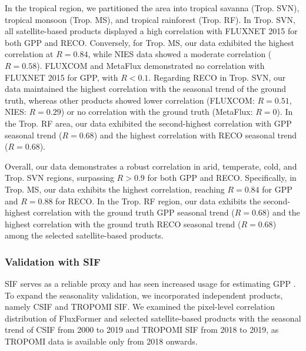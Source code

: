 In the tropical region, we partitioned the area into tropical savanna (Trop. SVN), tropical monsoon (Trop. MS), and tropical rainforest (Trop. RF). In Trop. SVN, all satellite-based products displayed a high correlation with FLUXNET 2015 for both GPP and RECO. Conversely, for Trop. MS, our data exhibited the highest correlation at $R=0.84$, while NIES data showed a moderate correlation ($R=0.58$). FLUXCOM and MetaFlux demonstrated no correlation with FLUXNET 2015 for GPP, with $R<0.1$. Regarding RECO in Trop. SVN, our data maintained the highest correlation with the seasonal trend of the ground truth, whereas other products showed lower correlation (FLUXCOM: $R=0.51$, NIES: $R=0.29$) or no correlation with the ground truth (MetaFlux: $R=0$). In the Trop. RF area, our data exhibited the second-highest correlation with GPP seasonal trend ($R=0.68$) and the highest correlation with RECO seasonal trend ($R=0.68$).\par
Overall, our data demonstrates a robust correlation in arid, temperate, cold, and Trop. SVN regions, surpassing $R> 0.9$ for both GPP and RECO. Specifically, in Trop. MS, our data exhibits the highest correlation, reaching $R=0.84$ for GPP and $R=0.88$ for RECO. In the Trop. RF region, our data exhibits the second-highest correlation with the ground truth GPP seasonal trend ($R=0.68$) and the highest correlation with the ground truth RECO seasonal trend ($R=0.68$) among the selected satellite-based products. \par


\subsubsection*{Validation with SIF}
SIF serves as a reliable proxy and has seen increased usage for estimating GPP \citep{norton2019estimating, liu2020improving, bai2022estimation}. To expand the seasonality validation, we incorporated independent products, namely CSIF and TROPOMI SIF. We examined the pixel-level correlation distribution of FluxFormer and selected satellite-based products with the seasonal trend of CSIF from 2000 to 2019 and TROPOMI SIF from 2018 to 2019, as TROPOMI data is available only from 2018 onwards.\par


